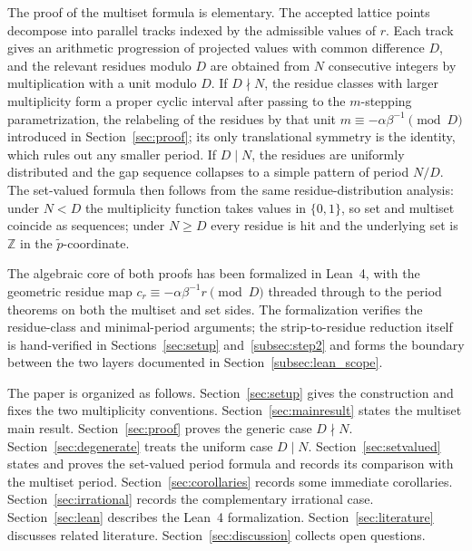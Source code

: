 \documentclass[11pt,reqno]{amsart}
\theoremstyle{plain}
\theoremstyle{definition}
\theoremstyle{remark}
\begin{document}
The proof of the multiset formula is elementary.  The accepted lattice
points decompose into parallel tracks indexed by the admissible values of
\(r\).  Each track gives an arithmetic progression of projected values with
common difference \(D\), and the relevant residues modulo \(D\) are
obtained from \(N\) consecutive integers by multiplication with a unit
modulo \(D\).  If \(D\nmid N\), the residue classes with larger multiplicity
form a proper cyclic interval after passing to the \(m\)-stepping
parametrization, the relabeling of the residues by that unit
\(m \equiv -\alpha\beta^{-1} \pmod{D}\) introduced in
Section~\ref{sec:proof}; its only translational symmetry is the identity, which
rules out any smaller period.  If \(D\mid N\), the residues are uniformly distributed and the gap
sequence collapses to a simple pattern of period \(N/D\).  The set-valued
formula then follows from the same residue-distribution analysis: under
\(N < D\) the multiplicity function takes values in \(\{0, 1\}\), so set
and multiset coincide as sequences; under \(N \ge D\) every residue is hit
and the underlying set is~\(\mathbb{Z}\) in the \(\tilde{p}\)-coordinate.

The algebraic core of both proofs has been formalized in Lean~4, with the
geometric residue map
\(c_r \equiv -\alpha\beta^{-1}r \pmod{D}\) threaded through to the period
theorems on both the multiset and set sides.  The formalization verifies
the residue-class and minimal-period arguments; the strip-to-residue
reduction itself is hand-verified in Sections~\ref{sec:setup}
and~\ref{subsec:step2} and forms the boundary between the two layers
documented in Section~\ref{subsec:lean_scope}.

The paper is organized as follows.  Section~\ref{sec:setup} gives the
construction and fixes the two multiplicity conventions.
Section~\ref{sec:mainresult} states the multiset main result.
Section~\ref{sec:proof} proves the generic case \(D \nmid N\).
Section~\ref{sec:degenerate} treats the uniform case \(D \mid N\).
Section~\ref{sec:setvalued} states and proves the set-valued period formula
and records its comparison with the multiset period.
Section~\ref{sec:corollaries} records some immediate corollaries.
Section~\ref{sec:irrational} records the complementary irrational case.
Section~\ref{sec:lean} describes the Lean~4 formalization.
Section~\ref{sec:literature} discusses related literature.
Section~\ref{sec:discussion} collects open questions.

\end{document}
